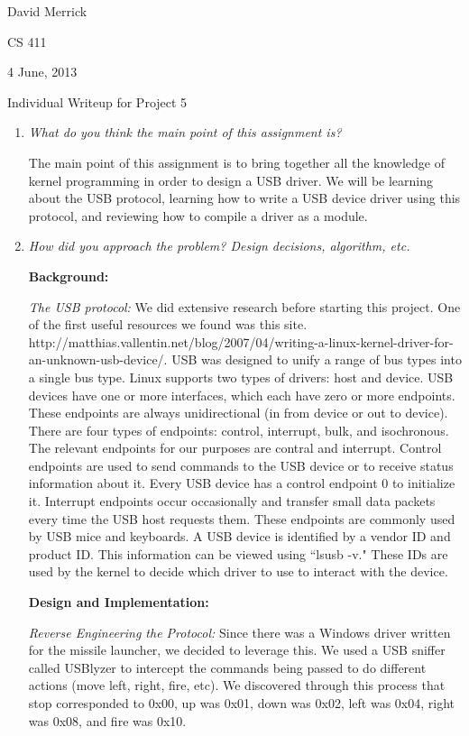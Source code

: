 \documentclass[letterpaper,10pt,titlepage]{article}
\newcommand{\tab}{\hspace*{2em}} %
\def\name{David Merrick}
\def\project{Project 5}
\def\date{4 June, 2013}
\begin{document}
\name

CS 411

\date

\begin{center}
{\LARGE Individual Writeup for \project}
\end{center}

\begin{enumerate} 
\item \emph{What do you think the main point of this assignment is?}

\tab The main point of this assignment is to bring together all the knowledge of kernel programming in order to design a USB driver. We will be learning about the USB protocol, learning how to write a USB device driver using this protocol, and reviewing how to compile a driver as a module.

\item \emph{How did you approach the problem? Design decisions, algorithm, etc.}\newline

\textbf{Background:} 

\tab \emph{The USB protocol:} We did extensive research before starting this project. One of the first useful resources we found was this site. http://matthias.vallentin.net/blog/2007/04/writing-a-linux-kernel-driver-for-an-unknown-usb-device/. USB was designed to unify a range of bus types into a single bus type. Linux supports two types of drivers: host and device. USB devices have one or more interfaces, which each have zero or more endpoints. These endpoints are always unidirectional (in from device or out to device). There are four types of endpoints: control, interrupt, bulk, and isochronous. The relevant endpoints for our purposes are contral and interrupt. Control endpoints are used to send commands to the USB device or to receive status information about it. Every USB device has a control endpoint 0 to initialize it. Interrupt endpoints occur occasionally and transfer small data packets every time the USB host requests them. These endpoints are commonly used by USB mice and keyboards. A USB device is identified by a vendor ID and product ID. This information can be viewed using ``lsusb -v." These IDs are used by the kernel to decide which driver to use to interact with the device.

\textbf{Design and Implementation:} 

\tab \emph{Reverse Engineering the Protocol:} Since there was a Windows driver written for the missile launcher, we decided to leverage this. We used a USB sniffer called USBlyzer to intercept the commands being passed to do different actions (move left, right, fire, etc). We discovered through this process that stop corresponded to 0x00, up was 0x01, down was 0x02, left was 0x04, right was 0x08, and fire was 0x10. 


\end{enumerate}
\end{document}
